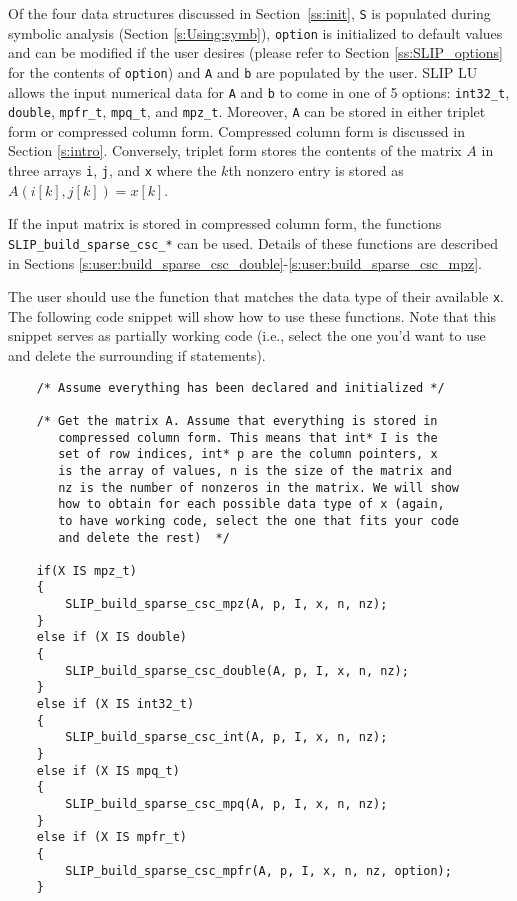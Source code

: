 \documentclass[12pt]{article}
\theoremstyle{definition}
\begin{document}
Of the four data structures discussed in Section~\ref{ss:init}, \verb|S| is
populated during symbolic analysis (Section \ref{s:Using:symb}), \verb|option|
is initialized to default values and can be modified if the user desires
(please refer to Section \ref{ss:SLIP_options} for the contents of
\verb|option|) and \verb|A| and \verb|b| are populated by the user. SLIP LU
allows the input numerical data for \verb|A| and \verb|b| to come in one of 5
options: \verb|int32_t|, \verb|double|, \verb|mpfr_t|, \verb|mpq_t|, and
\verb|mpz_t|. Moreover, \verb|A| can be stored in either triplet form or
compressed column form.  Compressed column form is discussed in Section
\ref{s:intro}. Conversely, triplet form stores the contents of the matrix $A$
in three arrays \verb|i|, \verb|j|, and \verb|x| where the $k$th nonzero entry
is stored as $A ( i[k], j[k]) = x[k]$.

If the input matrix is stored in compressed column form, the functions \\
\verb|SLIP_build_sparse_csc_*| can be used. Details of these functions are
described in Sections
\ref{s:user:build_sparse_csc_double}-\ref{s:user:build_sparse_csc_mpz}.

The user should use the function that matches the data type of their available
\verb|x|. The following code snippet will show how to use these functions. Note
that this snippet serves as partially working code (i.e., select the one you'd
want to use and delete the surrounding if statements).

{\small
\begin{verbatim}
    /* Assume everything has been declared and initialized */

    /* Get the matrix A. Assume that everything is stored in
       compressed column form. This means that int* I is the
       set of row indices, int* p are the column pointers, x
       is the array of values, n is the size of the matrix and
       nz is the number of nonzeros in the matrix. We will show
       how to obtain for each possible data type of x (again,
       to have working code, select the one that fits your code
       and delete the rest)  */

    if(X IS mpz_t)
    {
        SLIP_build_sparse_csc_mpz(A, p, I, x, n, nz);
    }
    else if (X IS double)
    {
        SLIP_build_sparse_csc_double(A, p, I, x, n, nz);
    }
    else if (X IS int32_t)
    {
        SLIP_build_sparse_csc_int(A, p, I, x, n, nz);
    }
    else if (X IS mpq_t)
    {
        SLIP_build_sparse_csc_mpq(A, p, I, x, n, nz);
    }
    else if (X IS mpfr_t)
    {
        SLIP_build_sparse_csc_mpfr(A, p, I, x, n, nz, option);
    } \end{verbatim} }
\end{document}
